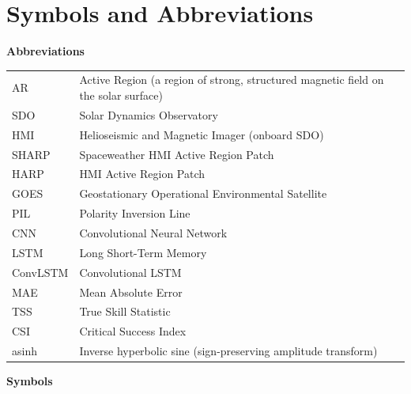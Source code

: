 \chapter*{Symbols and Abbreviations}

\vspace{0.8cm}

\noindent\textbf{Abbreviations}
\vspace{0.3cm}

\noindent
\begin{tabular}{l p{}}
AR        & Active Region (a region of strong, structured magnetic field on the solar surface) \\
SDO       & Solar Dynamics Observatory \\
HMI       & Helioseismic and Magnetic Imager (onboard SDO) \\
SHARP     & Spaceweather HMI Active Region Patch \\
HARP      & HMI Active Region Patch \\
GOES      & Geostationary Operational Environmental Satellite \\
PIL       & Polarity Inversion Line \\
CNN       & Convolutional Neural Network \\
LSTM      & Long Short-Term Memory \\
ConvLSTM  & Convolutional LSTM \\
MAE       & Mean Absolute Error \\
TSS       & True Skill Statistic \\
CSI       & Critical Success Index \\
asinh     & Inverse hyperbolic sine (sign-preserving amplitude transform) \\
\end{tabular}

\vspace{0.8cm}

\noindent\textbf{Symbols}
\vspace{0.3cm}

